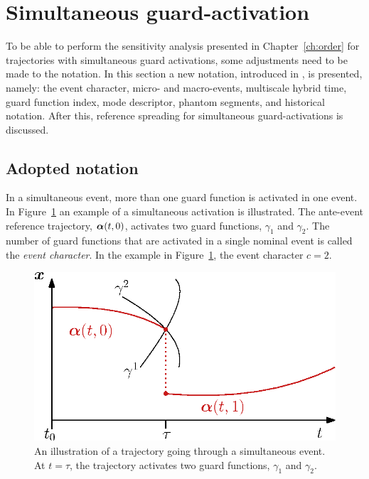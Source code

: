 \documentclass[../DC2017114Bouma.tex]{subfiles}
\begin{document}
\section{Simultaneous guard-activation}\label{sec:simguards}
To be able to perform the sensitivity analysis presented in Chapter~\ref{ch:order} for trajectories with simultaneous guard activations, some adjustments need to be made to the notation. In this section a new notation, introduced in \cite{Rijnen2018}, is presented, namely: the event character, micro- and macro-events, multiscale hybrid time, guard function index, mode descriptor, phantom segments, and historical notation. After this, reference spreading for simultaneous guard-activations is discussed.

\subsection{Adopted notation}
In a simultaneous event, more than one guard function is activated in one event. In Figure~\ref{fig:4simulexample} an example of a simultaneous activation is illustrated. The ante-event reference trajectory, $\boldsymbol{\alpha}(t,0)$, activates two guard functions, $\gamma_1$ and $\gamma_2$. The number of guard functions that are activated in a single nominal event is called the \textit{event character}. In the example in Figure~\ref{fig:4simulexample}, the event character $c = 2$.

\begin{figure}[h]
\centering
\includegraphics[width=.45\textwidth]{simulexample.eps}\caption{An illustration of a trajectory going through a simultaneous event. At $t=\tau$, the trajectory activates two guard functions, $\gamma_1$ and $\gamma_2$.} \label{fig:4simulexample}
\end{figure}
\end{document}
